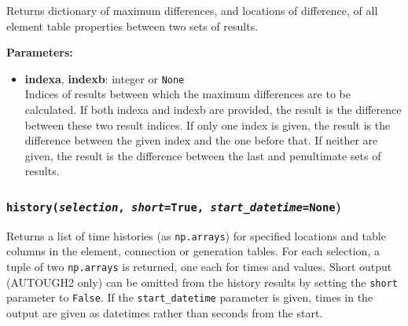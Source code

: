 Returns dictionary of maximum differences, and locations of difference, of all element table properties between two sets of results.

\textbf{Parameters:}
\begin{itemize}
\item \textbf{indexa}, \textbf{indexb}: integer or \texttt{None}\\
  Indices of results between which the maximum differences are to be calculated.  If both indexa and indexb are provided, the result is the difference between these two result indices.  If only one index is given, the result is the difference between the given index and the one before that.  If neither are given, the result is the difference between the last and penultimate sets of results.
\end{itemize}

\begin{snugshade}
\subsubsection{\texttt{history(\emph{selection},  \emph{short}=True, \emph{start\_datetime}=None})}
\end{snugshade}
\label{sec:t2listing:history}

Returns a list of time histories (as \texttt{np.arrays}) for specified locations and table columns in the element, connection or generation tables.  For each selection, a tuple of two \texttt{np.arrays} is returned, one each for times and values.  Short output (AUTOUGH2 only) can be omitted from the history results by setting the \texttt{short} parameter to \texttt{False}. If the \texttt{start\_datetime} parameter is given, times in the output are given as datetimes rather than seconds from the start.

